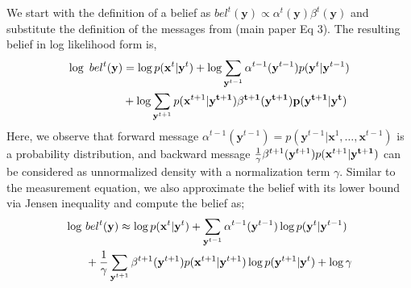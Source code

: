 \documentclass[conference]{IEEEtran}
\begin{document}
We start with the definition of a belief as \mbox{$bel^t(\mathbf{y}) \propto  \alpha^t(\mathbf{y}) \beta^t(\mathbf{y})$} and substitute the definition of the messages from (main paper Eq 3). The resulting belief in log likelihood form is,
\begin{equation}\small
\begin{aligned}
\log~bel^t(\mathbf{y}) &= \log p(\mathbf{x}^t|\mathbf{y}^t) + \log \sum_{\mathbf{y}^{t-1}} \alpha^{t-1}(\mathbf{y}^{t-1}) p(\mathbf{y}^{t}|\mathbf{y}^{t-1}) \\
&+ \log \sum_{\mathbf{y}^{t+1}} p(\mathbf{x}^{t+1}|\bf{y}^{t+1}) \beta^{t+1}(\mathbf{y}^{t+1}) p(\mathbf{y}^{t+1}|\mathbf{y}^{t})
\end{aligned}
\end{equation}
Here, we observe that forward message \mbox{$\alpha^{t-1}(\mathbf{y}^{t-1})=p(\mathbf{y}^{t-1}|\mathbf{x}^{1},\ldots,\mathbf{x}^{t-1})$} is a probability distribution, and backward message $\frac{1}{\gamma} \beta^{t+1} (\mathbf{y}^{t+1})  p(\mathbf{x}^{t+1}|\bf{y}^{t+1})$ can be considered as unnormalized density with a normalization term $\gamma$. Similar to the measurement equation, we also approximate the belief with its lower bound via Jensen inequality and compute the belief as;
\begin{equation}\small
  \begin{aligned}
\log~&bel^t(\mathbf{y}) \approx \log p(\mathbf{x}^t|\mathbf{y}^t) + \sum_{\mathbf{y}^{t-1}} \alpha^{t-1}(\mathbf{y}^{t-1}) \log p(\mathbf{y}^{t}|\mathbf{y}^{t-1}) \\
&+ \frac{1}{\gamma}\sum_{\mathbf{y}^{t+1}}\beta^{t+1}(\mathbf{y}^{t+1}) p(\mathbf{x}^{t+1}|\mathbf{y}^{t+1}) \log p(\mathbf{y}^{t+1}|\mathbf{y}^{t})+\log{\gamma}
\end{aligned}
\end{equation}
\end{document}
